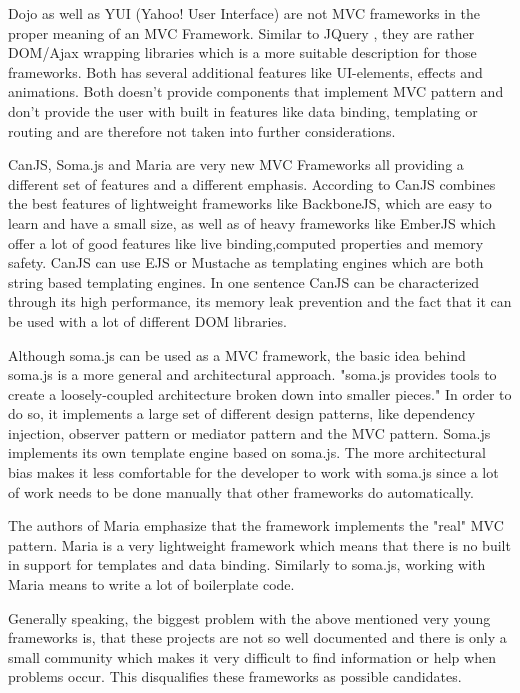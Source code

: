 Dojo as well as YUI (Yahoo! User Interface) are not MVC frameworks in the proper meaning of an MVC Framework.
Similar to JQuery , they are rather DOM/Ajax wrapping libraries which is a more suitable description for those frameworks.
Both has several additional features like UI-elements, effects and animations.
Both doesn't provide components that implement MVC pattern and don't provide the user with built in features like data binding, templating or routing and are therefore not taken into further considerations.

CanJS, Soma.js and Maria are very new MVC Frameworks all providing a different set of features and a different emphasis.
According to \autocite{tech-ana:canJS-presentation} CanJS combines the best features of lightweight frameworks like BackboneJS, which are easy to learn and have a small size, as well as of heavy frameworks like EmberJS which offer a lot of good features like live binding,computed properties and memory safety.
CanJS can use EJS or Mustache as templating engines which are both string based templating engines.
In one sentence CanJS can be characterized through its high performance, its memory leak prevention and the fact that it can be used with a lot of different DOM libraries.

Although soma.js can be used as a MVC framework, the basic idea behind soma.js is a more general and architectural approach.
"soma.js  provides tools to create a loosely-coupled architecture broken down into smaller pieces." \autocite{tech-ana:somaJS} In order to do so, it implements a large set of different design patterns, like dependency injection, observer pattern or mediator pattern and the MVC pattern.
Soma.js implements its own template engine based on soma.js.
The more architectural bias makes it less comfortable for the developer to work with soma.js since a lot of work needs to be done manually that other frameworks do automatically.

The authors of Maria emphasize that the framework implements the "real" MVC pattern.
Maria is a very lightweight framework which means that there is no built in support for templates and data binding.
Similarly to soma.js, working with Maria means to write a lot of boilerplate code.

Generally speaking, the biggest problem with the above mentioned very young frameworks is, that these projects are not so well documented and there is only a small community which makes it very difficult to find information or help when problems occur.
This disqualifies these frameworks as possible candidates.

